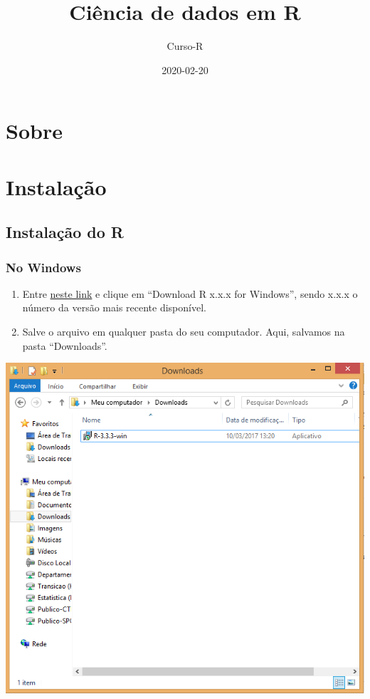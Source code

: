 \documentclass[
]{book}
\title{Ciência de dados em R}
\author{Curso-R}
\date{2020-02-20}
\begin{document}
\maketitle

{
\setcounter{tocdepth}{1}
\tableofcontents
}
\hypertarget{sobre}{%
\chapter*{Sobre}\label{sobre}}

\hypertarget{instalauxe7uxe3o}{%
\chapter{Instalação}\label{instalauxe7uxe3o}}

\hypertarget{instalauxe7uxe3o-do-r}{%
\section{Instalação do R}\label{instalauxe7uxe3o-do-r}}

\hypertarget{no-windows}{%
\subsection{No Windows}\label{no-windows}}

\begin{enumerate}
\def\labelenumi{\arabic{enumi}.}
\item
  Entre \href{https://cran.r-project.org/bin/windows/base/}{neste link} e clique em
  ``Download R x.x.x for Windows'', sendo x.x.x o número da versão mais recente disponível.
\item
  Salve o arquivo em qualquer pasta do seu computador. Aqui, salvamos na pasta ``Downloads''.
\end{enumerate}

\begin{center}\includegraphics[width=9.04in]{img/instalacao/01-r-salvo} \end{center}
\end{document}
